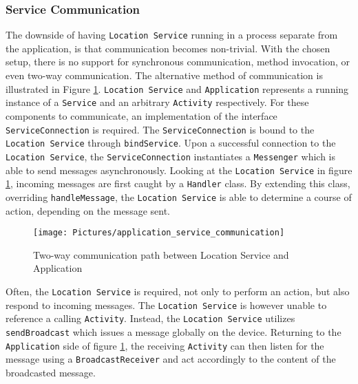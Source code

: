 \subsubsection{Service Communication}\label{subsubsec:service_communication}
The downside of having \texttt{Location Service} running in a process separate from the application, is that communication becomes non-trivial. With the chosen setup, there is no support for synchronous communication, method invocation, or even two-way communication. The alternative method of communication is illustrated in Figure \ref{fig:application_service_communication}.   \texttt{Location Service} and \texttt{Application} represents a running instance of a \texttt{Service} and an arbitrary \texttt{Activity} respectively. For these components to communicate, an implementation of the interface \texttt{ServiceConnection} is required\citep{android_serviceconnection}.  The \texttt{ServiceConnection} is bound to the \texttt{Location Service} through \texttt{bindService}\citep{android_bindservice}. Upon a successful connection to the \texttt{Location Service}, the \texttt{ServiceConnection} instantiates a \texttt{Messenger}\citep{android_messenger} which is able to send messages asynchronously. Looking at the \texttt{Location Service} in figure \ref{fig:application_service_communication}, incoming messages are first caught by a \texttt{Handler}\citep{android_handler} class. By extending this class, overriding \texttt{handleMessage}, the \texttt{Location Service} is able to determine a course of action, depending on the message sent.

\begin{figure}[tb]
\centering
\texttt{[image: Pictures/application\_service\_communication]}
\caption{Two-way communication path between Location Service and Application}
\label{fig:application_service_communication}
\end{figure}

Often, the \texttt{Location Service} is required, not only to perform an action, but also respond to incoming messages. The \texttt{Location Service} is however unable to reference a calling \texttt{Activity}. Instead, the \texttt{Location Service} utilizes \texttt{sendBroadcast}\citep{android_sendbroadcast} which issues a message globally on the device. Returning to the \texttt{Application} side of figure \ref{fig:application_service_communication}, the receiving \texttt{Activity} can then listen for the message using a \texttt{BroadcastReceiver}\citep{android_broadcastreceiver} and act accordingly to the content of the broadcasted message. 

